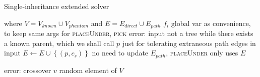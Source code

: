 \begin{algorithm} 
  \caption{Single-inheritance extended solver}
  \label{alg:single:ext}

  \hrulefill

  \begin{algorithmic}[1]
     where $V = V_{known} \cup V_{phantom}$ and $E = E_{direct} \cup E_{path}$
    \State \Global $f_i$ \Comment global var as convenience, to keep same args for \textsc{placeUnder}, \textsc{pick}
        \State error: input not a tree
      \Else
      \EndIf
    \EndFor
         \Comment while there exists a known parent, which we shall call $p$
            \Comment just for tolerating extraneous path edges in input
            \State $E \gets E \cup \left\{(p,c_s)\right\}$ \label{lst:line:add} \Comment no need to update $E_{path}$, \textsc{placeUnder} only uses $E$
          \EndIf
        \EndWhile
      \EndFor
    \State \Return {} 
    \EndFunction
  \end{algorithmic}

  \hrulefill

  \begin{algorithmic}[1]
     \label{lst:line:priority}
        \State error: crossover %
      \Else
        \State \Return $v$
      \EndIf
    \Else
    \State \Return random element of $V$
    \EndIf
    \EndFunction
  \end{algorithmic}
\end{algorithm} 

